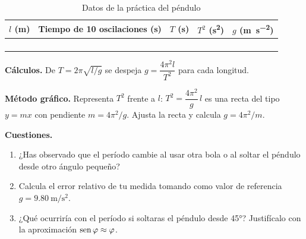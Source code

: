 \begin{table}[H]
    \centering
    \caption{Datos de la práctica del péndulo}
    \vspace{-5pt}
    \begin{tabular}{@{}C{2.6cm}C{3.6cm}C{2.4cm}C{2.4cm}C{2.4cm}@{}}
        \toprule
        \textbf{\(l\) (\unit{\m})} & \textbf{Tiempo de 10 oscilaciones (\unit{\second})} & \textbf{\(T\) (\unit{\second})} & \textbf{\(T^2\) (\unit{\second\squared})} & \textbf{\(g\) (\unit{\m\per\second\squared})} \\
        \midrule
        \rule{0pt}{18pt} & & & & \\ \midrule[0.3pt]
        \rule{0pt}{18pt} & & & & \\ \midrule[0.3pt]
        \rule{0pt}{18pt} & & & & \\ \midrule[0.3pt]
        \rule{0pt}{18pt} & & & & \\
        \bottomrule
    \end{tabular}
    \label{tab:mas-practica-pendulo}
\end{table}

\textbf{Cálculos.} De \(T = 2\pi\sqrt{l/g}\) se despeja \(g = \dfrac{4\pi^2 l}{T^2}\) para cada longitud.

\textbf{Método gráfico.} Representa \(T^2\) frente a \(l\): \(T^2 = \dfrac{4\pi^2}{g}\,l\) es una recta del tipo \(y = m x\)
con pendiente \(m = 4\pi^2/g\). Ajusta la recta y calcula \(g = 4\pi^2/m\).

\textbf{Cuestiones.}
\begin{enumerate}[label=\letraminuscula]
    \item ¿Has observado que el período cambie al usar otra bola o al soltar el péndulo desde otro ángulo pequeño?
    \item Calcula el error relativo de tu medida tomando como valor de referencia \(g = \qty{9.80}{\m\per\second\squared}\).
    \item ¿Qué ocurriría con el período si soltaras el péndulo desde \ang{45}? Justifícalo con la aproximación \(\operatorname{sen}\varphi \approx \varphi\).
\end{enumerate}
